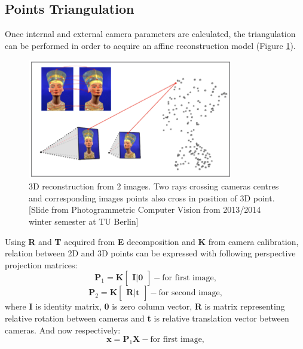 \subsection{Points Triangulation} \label{sec:points_triangulation}
Once internal and external camera parameters are calculated, the triangulation can be performed in order to acquire an affine reconstruction model (Figure \ref{fig:3Dreconstruction}).
\begin{figure}[h]
    \centering
    \includegraphics[width=0.8\textwidth]{3Dreconstruction}
    \caption[3D reconstruction from 2 images]{3D reconstruction from 2 images. Two rays crossing cameras centres and corresponding images points also cross in position of 3D point. [Slide from Photogrammetric Computer Vision from 2013/2014 winter semester at TU Berlin]}
    \label{fig:3Dreconstruction}
\end{figure}
Using \textbf{R} and \textbf{T} acquired from \textbf{E} decomposition and \textbf{K} from camera calibration, relation between 2D and 3D points can be expressed with following perspective projection matrices:
\begin{equation}
 \textbf{P}_{1} = \textbf{K} \begin{bmatrix}\textbf{I}\mid \textbf{0}\end{bmatrix} - \text{for first image,}
\end{equation}
\begin{equation}
 \textbf{P}_{2} = \textbf{K}  \begin{bmatrix}\textbf{R}\mid \textbf{t}\end{bmatrix} - \text{for second image,}
\end{equation}
where \textbf{I} is identity matrix, \textbf{0} is zero column vector, \textbf{R} is matrix representing relative rotation between cameras and \textbf{t} is relative translation vector between cameras. And now respectively:
\begin{equation}
 \textbf{x} = \textbf{P}_{1} \textbf{X} - \text{for first image,}
\end{equation}
